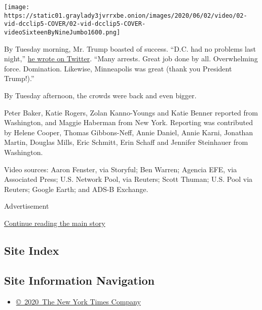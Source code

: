 \texttt{[image: https://static01.graylady3jvrrxbe.onion/images/2020/06/02/video/02-vid-dcclip5-COVER/02-vid-dcclip5-COVER-videoSixteenByNineJumbo1600.png]}

By Tuesday morning, Mr. Trump boasted of success. ``D.C. had no problems
last night,''
\href{https://twitter.com/realDonaldTrump/status/1267808120136511489}{he
wrote on Twitter}. ``Many arrests. Great job done by all. Overwhelming
force. Domination. Likewise, Minneapolis was great (thank you President
Trump!).''

By Tuesday afternoon, the crowds were back and even bigger.

Peter Baker, Katie Rogers, Zolan Kanno-Youngs and Katie Benner reported
from Washington, and Maggie Haberman from New York. Reporting was
contributed by Helene Cooper, Thomas Gibbons-Neff, Annie Daniel, Annie
Karni, Jonathan Martin, Douglas Mills, Eric Schmitt, Erin Schaff and
Jennifer Steinhauer from Washington.

Video sources: Aaron Fenster, via Storyful; Ben Warren; Agencia EFE, via
Associated Press; U.S. Network Pool, via Reuters; Scott Thuman; U.S.
Pool via Reuters; Google Earth; and ADS-B Exchange.

Advertisement

\protect\hyperlink{after-bottom}{Continue reading the main story}

\hypertarget{site-index}{%
\subsection{Site Index}\label{site-index}}

\hypertarget{site-information-navigation}{%
\subsection{Site Information
Navigation}\label{site-information-navigation}}

\begin{itemize}
\tightlist
\item
  \href{https://help.nytimes3xbfgragh.onion/hc/en-us/articles/115014792127-Copyright-notice}{©~2020~The
  New York Times Company}
\end{itemize}


